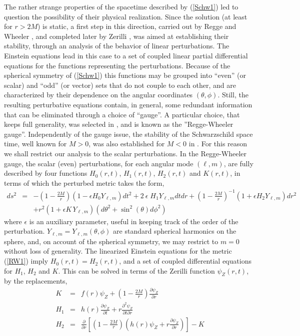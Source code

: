 \documentclass[12pt,aps,floats,showpacs,amssymb,tightenlines]{revtex4}
\newcommand{\e}{\epsilon}
\begin{document}
The rather strange properties of the spacetime described by
(\ref{Schw1}) led to question the possibility of their physical
realization. Since the solution (at least for $r>2M$) is static, a
first step in this direction, carried out by Regge and Wheeler \cite{RW}, and
completed later by Zerilli \cite{Zerilli}, was aimed at establishing their
stability, through an analysis of the behavior of linear
perturbations. The Einstein equations lead in this case to a set of
coupled linear partial differential equations for the functions
representing the perturbations. Because of the spherical symmetry of
(\ref{Schw1}) this functions may be grouped into ``even'' (or
scalar) and ``odd'' (or vector) sets that do not couple to each
other, and are characterized by their dependence on the angular
coordinates $(\theta,\phi)$. Still, the resulting perturbative
equations contain, in general, some redundant information that can
be eliminated through a choice of ``gauge''.
A particular choice, that keeps full generality, was selected in
\cite{RW}, \cite{Zerilli} and is known as the ''Regge-Wheeler gauge''. Independently of the gauge issue, the stability of the Schwarzschild space time, well known for $M>0$, was also established for $M<0$ in \cite{ghi}. For this reason we shall restrict our analysis to the scalar
perturbations.  In the Regge-Wheeler gauge, the scalar (even)
perturbations, for each angular mode $(\ell,m)$,  are fully
described by  four functions $H_0(r,t)$, $H_1(r,t)$, $H_2(r,t)$ and
$K(r,t)$, in terms of which the perturbed metric takes the form,
\begin{eqnarray}
\label{RW1}
ds^2 & = & -\left(1-\frac{2M}{r}\right)\left(1- \e H_0 Y_{\ell,m}\right)dt^2 +
2 \: \e \;  H_1 Y_{\ell,m} dt dr+\left(1-\frac{2M}{r}\right)^{-1}\left(1+ \e H_2 Y_{\ell,m}\right)dr^2
\nonumber \\
& & +r^2\left(1+ \e K\, Y_{\ell,m}\right) \left( d \theta^2 +  \sin^2(\theta)
d \phi^2 \right)
\end{eqnarray}
where $\epsilon$ is an auxiliary parameter, useful in keeping track of the order of the perturbation.
$Y_{\ell,m}=  Y_{\ell,m}(\theta,\phi)$ are standard spherical
harmonics on the sphere, and, on account of the spherical symmetry, we may restrict to $m=0$ without loss of generality. The linearized Einstein equations for the
metric (\ref{RW1}) imply $H_0(r,t)=H_2(r,t)$, and a set of coupled
differential equations for $H_1$, $H_2$ and $K$. This can be solved
in terms of the Zerilli function $\psi_Z(r,t)$, by the replacements,
\begin{eqnarray}
\label{RW2}
K & = & f(r) \psi_Z+\left(1-\frac{2M}{r}\right)\frac{\partial \psi_Z}{\partial r} \nonumber \\
H_1 & = & h(r)\frac{\partial \psi_Z}{\partial t}+r\frac{\partial^2 \psi_Z}{\partial t \partial r}
 \nonumber \\
H_2 & = & \frac{\partial }{\partial r}\left[\left(1-\frac{2M}{r}\right)\left(h(r) \psi_Z
+r\frac{\partial \psi_Z}{ \partial r} \right)\right] -K
\end{eqnarray}
\end{document}
